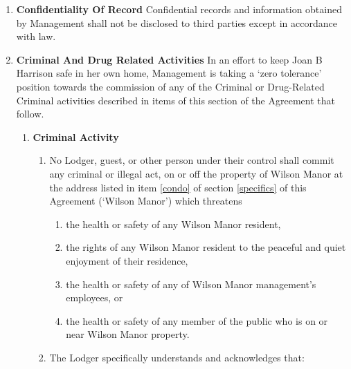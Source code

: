 \documentclass[12pt,letterpaper]{article}
\newcommand{\mom}{Joan B Harrison}
\newcommand{\management}{Management}
\newcommand{\condo}{Wilson Manor}
\newcommand{\lodger}{Lodger}
\newcommand{\lemail}{Lodger Email}
\newcommand{\paymenttime}{Payment Notification Time-Date}
\begin{document}
\begin{enumerate}
\begin{enumerate}
\begin{enumerate}
					\item For reasons of security and convenience, \management{} shall not accept cash payments. Unless otherwise directed in writing by \management{}, all payments shall be made through Venmo's website https://venmo.com/, one of Venmo's apps for Android/iOS, or by any other method Venmo provides. 
				\end{enumerate}
			\item \textbf{Receipt} \quad \management{} will provide receipt of payment via one of the \lemail{} that is set forth in item \ref{lemail} of section \ref{specifics} of this Agreement{}, and record payment was received at the \paymenttime{}. 
		\end{enumerate}
	\item \textbf{Confidentiality Of Record} \quad 
		Confidential records and information obtained by \management{} shall not be disclosed to third parties except in accordance with law. 
	\item \textbf{Criminal And Drug Related Activities} \quad 
		In an effort to keep \mom{} safe in her own home, \management{} is taking a `zero tolerance' position towards the commission of any of the Criminal or Drug-Related Criminal activities described in items of this section of the Agreement that follow. 
		\begin{enumerate} 
			\item \textbf{Criminal Activity} \quad \label{criminal}
				\begin{enumerate}
					\item No \lodger{}, guest, or other person under their control shall commit any criminal or illegal act, on or off the property of \condo{} at the address listed in item \ref{condo} of section \ref{specifics} of this Agreement (`\condo{}') which threatens 
						\begin{enumerate} 
							\item the health or safety of any \condo{} resident, 
							\item the rights of any \condo{} resident to the peaceful and quiet enjoyment of their residence, 
							\item the health or safety of any of \condo{} management's employees, or 
							\item the health or safety of any member of the public who is on or near \condo{} property. 
						\end{enumerate} 
					\item The \lodger{} specifically understands and acknowledges that: 
						\begin{enumerate} 

\end{enumerate}
\end{enumerate}
\end{enumerate}
\end{enumerate}
\end{document}
